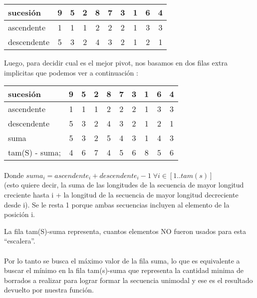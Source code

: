 \begin{center}
   \begin{tabular}{| l | c | c |c |c |c |c |c |c |c | }
     \hline
     sucesión & 9 & 5 & 2 & 8 & 7 & 3 & 1 & 6 & 4 \\ \hline
     ascendente & 1& 1& 1& 2& 2& 2& 1 &3 & 3 \\ \hline
     descendente & 5& 3& 2& 4& 3& 2& 1 &2 & 1 \\ \hline
          \hline
   \end{tabular}
 \end{center}

Luego, para decidir cual es el mejor pivot, nos basamos en dos filas extra implicitas que podemos ver a continuación :

\begin{center}
   \begin{tabular}{| l | c | c |c |c |c |c |c |c |c | }
     \hline
     sucesión 		& 9& 5& 2& 8& 7& 3& 1 &6 & 4 \\ \hline
     ascendente 	& 1& 1& 1& 2& 2& 2& 1 &3 & 3 \\ \hline
     descendente 	& 5& 3& 2& 4& 3& 2& 1 &2 & 1 \\ \hline
     suma	 	& 5& 3& 2& 5& 4& 3& 1 &4 & 3 \\ \hline
     tam(S) - suma;	& 4& 6& 7& 4& 5& 6& 8 &5 & 6 \\ \hline
     
          \hline
   \end{tabular}
 \end{center}


\paragraph{}
Donde $suma_i = ascendente_i + descendente_i - 1 \; \forall i \in [ 1..tam(s)]$ \\(esto quiere decir, la suma de las longitudes de la secuencia de mayor longitud creciente hasta i + la longitud de la secuencia de mayor longitud decreciente desde i). Se le resta 1 porque ambas secuencias incluyen al elemento de la posición i.

La fila tam(S)-suma representa, cuantos elementos NO fueron usados para esta ``escalera''. 


\paragraph{}
Por lo tanto se busca el máximo valor de la fila suma, lo que es equivalente a buscar el mínimo en la fila tam(s)-suma que representa la cantidad minima de borrados a realizar para lograr formar la secuencia unimodal y ese es el resultado devuelto por nuestra función.

